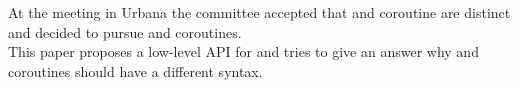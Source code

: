 At the meeting in Urbana the committee accepted that \sless and \sfull coroutine
are distinct and decided to pursue \sless and \sfull coroutines.\\
This paper proposes a low-level API for \sfcoros and tries to give an answer why
\sless and \sfull coroutines should have a different syntax.
